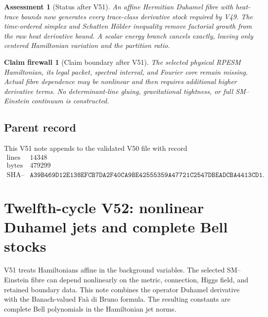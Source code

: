 \documentclass[11pt]{article}
\newtheorem{firewall}[theorem]{Claim firewall}
\newtheorem{assessment}[theorem]{Assessment}
\theoremstyle{remark}
\begin{document}
\begin{assessment}[Status after V51]
\label{ass:v12v51-status}
An affine Hermitian Duhamel fibre with heat-trace bounds now
generates every trace-class derivative stock required by V49.
The time-ordered simplex and Schatten H\"older inequality remove
factorial growth from the raw heat derivative bound.  A scalar
energy branch cancels exactly, leaving only centered Hamiltonian
variation and the partition ratio.
\end{assessment}

\begin{firewall}[Claim boundary after V51]
\label{fire:v12v51-claim}
The selected physical RPESM Hamiltonian, its legal packet, spectral
interval, and Fourier core remain missing.  Actual fibre dependence
may be nonlinear and then requires additional higher derivative
terms.  No determinant-line gluing, gravitational tightness, or
full SM--Einstein continuum is constructed.
\end{firewall}

\subsection{Parent record}

This V51 note appends to the validated V50 file with record
\[
\begin{array}{c|c}
\text{lines}&14348\\
\text{bytes}&479299\\
\text{SHA--256}&
\texttt{A39B469D12E138EFCB7DA2F40CA9BE42555359A47721C2547DBEADCBA4413CD1}.
\end{array}
\]


\section{Twelfth-cycle V52: nonlinear Duhamel jets and complete Bell
stocks}
\label{sec:v12v52}

V51 treats Hamiltonians affine in the background variables.  The
selected SM--Einstein fibre can depend nonlinearly on the metric,
connection, Higgs field, and retained boundary data.  This note
combines the operator Duhamel derivative with the Banach-valued
Fa\`a di Bruno formula.  The resulting constants are complete Bell
polynomials in the Hamiltonian jet norms.
\end{document}
